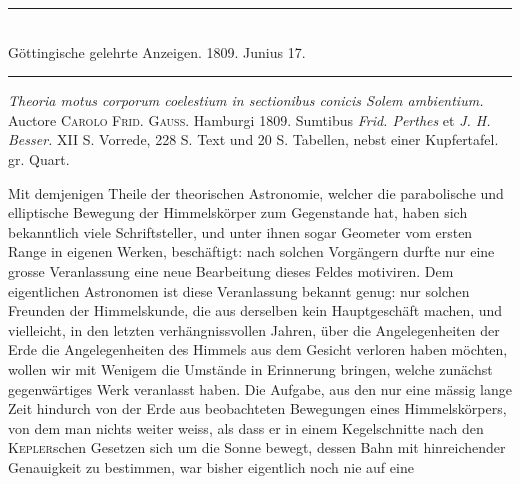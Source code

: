 \begin{center}\rule{.75\textwidth}{.3pt}\\
Göttingische gelehrte Anzeigen. 1809. Junius 17.\\
\rule{.75\textwidth}{.3pt}\end{center}
\textit{Theoria motus corporum coelestium in sectionibus conicis Solem ambientium.} Auctore \textsc{Carolo Frid. Gauss.} Hamburgi 1809. Sumtibus \textit{Frid. Perthes} et \textit{J. H. Besser.} XII S. Vorrede, 228 S. Text und 20 S. Tabellen, nebst einer Kupfertafel. gr. Quart.

Mit demjenigen Theile der theorischen Astronomie, welcher die parabolische und elliptische Bewegung der Himmelskörper zum Gegenstande hat, haben sich bekanntlich viele Schriftsteller, und unter ihnen sogar Geometer vom ersten Range in eigenen Werken, beschäftigt: nach solchen Vorgängern durfte nur eine grosse Veranlassung eine neue Bearbeitung dieses Feldes motiviren. Dem eigentlichen Astronomen ist diese Veranlassung bekannt genug: nur solchen Freunden der Himmelskunde, die aus derselben kein Hauptgeschäft machen, und vielleicht, in den letzten verhängnissvollen Jahren, über die Angelegenheiten der Erde die Angelegenheiten des Himmels aus dem Gesicht verloren haben möchten, wollen wir mit Wenigem die Umstände in Erinnerung bringen, welche zunächst gegenwärtiges Werk veranlasst haben. Die Aufgabe, aus den nur eine mässig lange Zeit hindurch von der Erde aus beobachteten Bewegungen eines Himmelskörpers, von dem man nichts weiter weiss, als dass er in einem Kegelschnitte nach den \textsc{Kepler}schen Gesetzen sich um die Sonne bewegt, dessen Bahn mit hinreichender Genauigkeit zu bestimmen, war bisher eigentlich noch nie auf eine
